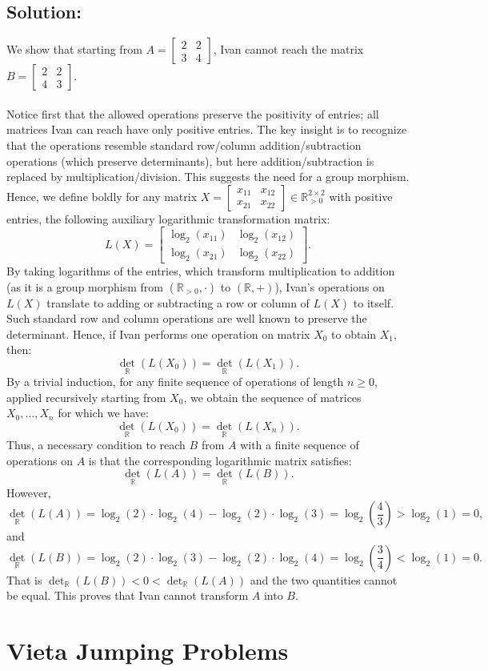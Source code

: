 \documentclass[11pt, a4paper, oneside]{article}
\newcommand{\problem}[1][]{\section{#1} \hfill \par}
\newcommand{\solution}[1][]{\subsection*{#1}\hfill \par}
\theoremstyle{remark}
\theoremstyle{lemma}
\begin{document}
\solution[Solution:] 
We show that starting from \( A = \begin{bmatrix} 2 & 2 \\ 3 & 4 \end{bmatrix} \), Ivan cannot reach the matrix \( B = \begin{bmatrix} 2 & 2 \\ 4 & 3 \end{bmatrix} \).
\\\\
Notice first that the allowed operations preserve the positivity of entries; all matrices Ivan can reach have only positive entries. The key insight is to recognize that the operations resemble standard row/column addition/subtraction operations (which preserve determinants), but here addition/subtraction is replaced by multiplication/division. This suggests the need for a group morphism. Hence, we define boldly for any matrix \( X = \begin{bmatrix} x_{11} & x_{12} \\ x_{21} & x_{22} \end{bmatrix} \in \mathbb{R}_{>0}^{2 \times 2} \) with positive entries, the following auxiliary logarithmic transformation matrix:
\[
L(X) = \begin{bmatrix} \log_2\left(x_{11}\right) & \log_2\left(x_{12}\right) \\ \log_2\left(x_{21}\right) & \log_2\left(x_{22}\right) \end{bmatrix}.
\]
By taking logarithms of the entries, which transform multiplication to addition (as it is a group morphism from \( (\mathbb{R}_{>0},\cdot) \) to \( (\mathbb{R},+) \)), Ivan's operations on \( L(X) \) translate to adding or subtracting a row or column of \( L(X) \) to itself. Such standard row and column operations are well known to preserve the determinant. Hence, if Ivan performs one operation on matrix \( X_0 \) to obtain \( X_1 \), then:
\[
{\det}_{\mathbb{R}}\left(L(X_0)\right)= {\det}_{\mathbb{R}}\left(L(X_1)\right).
\]
By a trivial induction, for any finite sequence of operations of length \( n \geq 0 \), applied recursively starting from \( X_0 \), we obtain the sequence of matrices \( X_0, \dots, X_n \) for which we have:
\[
{\det}_{\mathbb{R}}\left(L(X_0)\right)= {\det}_{\mathbb{R}}\left(L(X_n)\right).
\]
Thus, a necessary condition to reach \( B \) from \( A \) with a finite sequence of operations on \( A \) is that the corresponding logarithmic matrix satisfies:
\[
{\det}_{\mathbb{R}}\left(L(A)\right)= {\det}_{\mathbb{R}}\left(L(B)\right).
\]
However,
\[
{\det}_{\mathbb{R}}\left(L(A)\right) = \log_2\left(2\right) \cdot \log_2\left(4\right) - \log_2\left(2\right) \cdot \log_2\left(3\right) = \log_2\left(\frac{4}{3}\right) > \log_2\left(1\right) = 0,
\]
and
\[
{\det}_{\mathbb{R}}\left(L(B)\right) = \log_2\left(2\right) \cdot \log_2\left(3\right) - \log_2\left(2\right) \cdot \log_2\left(4\right) = \log_2\left(\frac{3}{4}\right) < \log_{2}\left(1\right) = 0.
\]
That is \( {\det}_{\mathbb{R}}\left(L(B)\right) < 0 < {\det}_{\mathbb{R}}\left(L(A)\right) \) and the two quantities cannot be equal. This proves that Ivan cannot transform \( A \) into \( B \).
\newpage
\problem[Vieta Jumping Problems]
\end{document}
